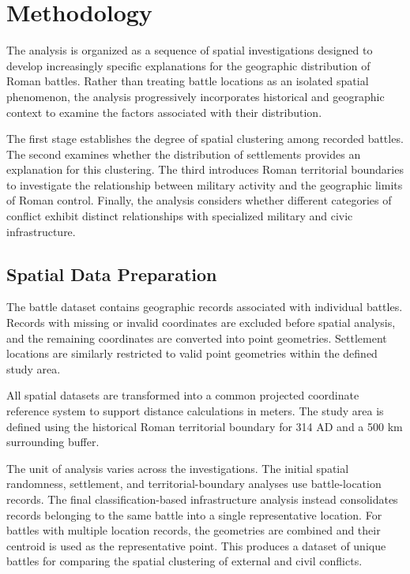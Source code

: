 \documentclass[
  letterpaper,
  DIV=11,
  numbers=noendperiod]{scrartcl}
\begin{document}
\section{Methodology}\label{methodology}

The analysis is organized as a sequence of spatial investigations
designed to develop increasingly specific explanations for the
geographic distribution of Roman battles. Rather than treating battle
locations as an isolated spatial phenomenon, the analysis progressively
incorporates historical and geographic context to examine the factors
associated with their distribution.

The first stage establishes the degree of spatial clustering among
recorded battles. The second examines whether the distribution of
settlements provides an explanation for this clustering. The third
introduces Roman territorial boundaries to investigate the relationship
between military activity and the geographic limits of Roman control.
Finally, the analysis considers whether different categories of conflict
exhibit distinct relationships with specialized military and civic
infrastructure.

\subsection{Spatial Data Preparation}\label{spatial-data-preparation}

The battle dataset contains geographic records associated with
individual battles. Records with missing or invalid coordinates are
excluded before spatial analysis, and the remaining coordinates are
converted into point geometries. Settlement locations are similarly
restricted to valid point geometries within the defined study area.

All spatial datasets are transformed into a common projected coordinate
reference system to support distance calculations in meters. The study
area is defined using the historical Roman territorial boundary for 314
AD and a 500 km surrounding buffer.

The unit of analysis varies across the investigations. The initial
spatial randomness, settlement, and territorial-boundary analyses use
battle-location records. The final classification-based infrastructure
analysis instead consolidates records belonging to the same battle into
a single representative location. For battles with multiple location
records, the geometries are combined and their centroid is used as the
representative point. This produces a dataset of unique battles for
comparing the spatial clustering of external and civil conflicts.
\end{document}
